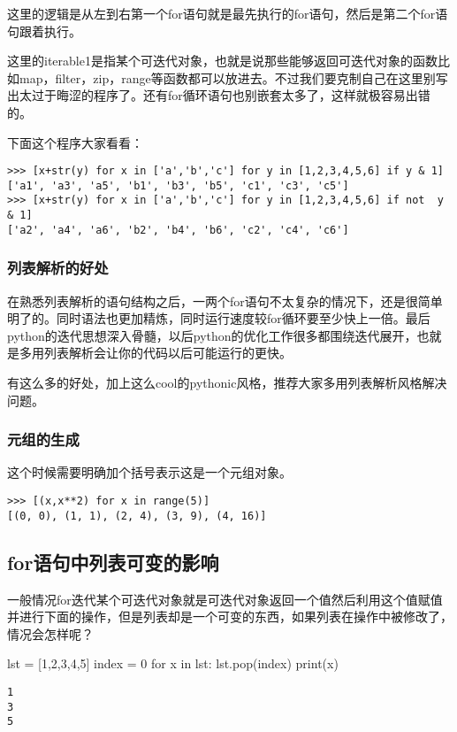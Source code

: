 \documentclass[12pt,oneside]{book}
\begin{document}
\begin{common-format}
这里的逻辑是从左到右第一个for语句就是最先执行的for语句，然后是第二个for语句跟着执行。

这里的iterable1是指某个可迭代对象，也就是说那些能够返回可迭代对象的函数比如map，filter，zip，range等函数都可以放进去。不过我们要克制自己在这里别写出太过于晦涩的程序了。还有for循环语句也别嵌套太多了，这样就极容易出错的。

下面这个程序大家看看：
\begin{Verbatim}
>>> [x+str(y) for x in ['a','b','c'] for y in [1,2,3,4,5,6] if y & 1]
['a1', 'a3', 'a5', 'b1', 'b3', 'b5', 'c1', 'c3', 'c5']
>>> [x+str(y) for x in ['a','b','c'] for y in [1,2,3,4,5,6] if not  y & 1]
['a2', 'a4', 'a6', 'b2', 'b4', 'b6', 'c2', 'c4', 'c6']
\end{Verbatim}

\subsubsection{列表解析的好处}
在熟悉列表解析的语句结构之后，一两个for语句不太复杂的情况下，还是很简单明了的。同时语法也更加精炼，同时运行速度较for循环要至少快上一倍。最后python的迭代思想深入骨髓，以后python的优化工作很多都围绕迭代展开，也就是多用列表解析会让你的代码以后可能运行的更快。

有这么多的好处，加上这么cool的pythonic风格，推荐大家多用列表解析风格解决问题。


\subsubsection{元组的生成}
这个时候需要明确加个括号表示这是一个元组对象。
\begin{Verbatim}
>>> [(x,x**2) for x in range(5)]
[(0, 0), (1, 1), (2, 4), (3, 9), (4, 16)]
\end{Verbatim}



\subsection{for语句中列表可变的影响}
一般情况for迭代某个可迭代对象就是可迭代对象返回一个值然后利用这个值赋值并进行下面的操作，但是列表却是一个可变的东西，如果列表在操作中被修改了，情况会怎样呢？

\begin{tcbpython}[]
lst = [1,2,3,4,5]
index = 0
for x in lst:
    lst.pop(index)
    print(x)
\end{tcbpython}

\begin{Verbatim}
1
3
5
\end{Verbatim}


\end{common-format}
\end{document}

